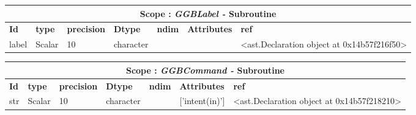 \documentclass{report}
\begin{document}
 \vspace{1cm}

\begin{center}
\begin{longtable}{|p{3.5cm}|p{1.5cm}|p{1.5cm}|p{1.5cm}|p{1cm}|p{2cm}|p{4cm}| }
\hline
\multicolumn{7}{|c|}{\textbf{Scope : \qquad}  \textbf{\textit{GGBLabel - }Subroutine}}\\ 
\hline
\textbf{Id} & \textbf{type} & \textbf{precision} & \textbf{Dtype} & \textbf{ndim} & \textbf{Attributes} & \textbf{ref} \\\hline

label & Scalar & 10 & character &  &  & <ast.Declaration object at 0x14b57f216f50> \\\hline

\end{longtable}
\end{center}

 \vspace{1cm}

\begin{center}
\begin{longtable}{|p{3.5cm}|p{1.5cm}|p{1.5cm}|p{1.5cm}|p{1cm}|p{2cm}|p{4cm}| }
\hline
\multicolumn{7}{|c|}{\textbf{Scope : \qquad}  \textbf{\textit{GGBCommand - }Subroutine}}\\ 
\hline
\textbf{Id} & \textbf{type} & \textbf{precision} & \textbf{Dtype} & \textbf{ndim} & \textbf{Attributes} & \textbf{ref} \\\hline

str & Scalar & 10 & character &  & ['intent(in)'] & <ast.Declaration object at 0x14b57f218210> \\\hline

\end{longtable}
\end{center}

 \vspace{1cm}
\end{document}
